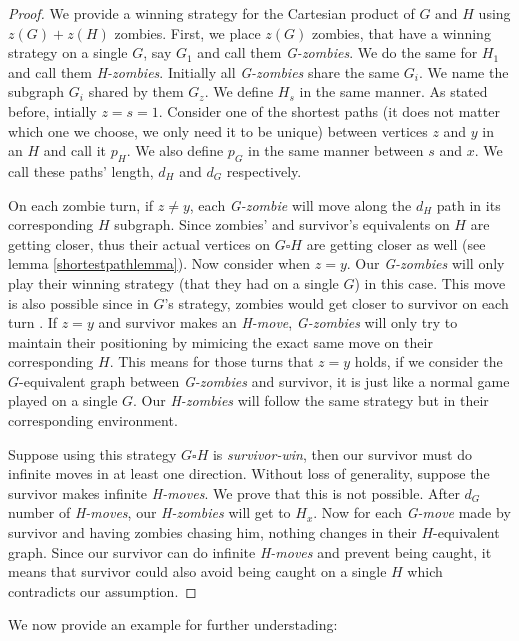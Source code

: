 \documentclass[1p]{elsarticle}
\begin{document}
\begin{proof}
	We provide a winning strategy for the Cartesian product of $G$ and $H$ using $z(G)+z(H)$ zombies. First, we place
	$z(G)$ zombies, that have a winning strategy on a single $G$, say $G_{1}$ and call them {\it G-zombies}. We do the
	same for $H_{1}$ and call them {\it H-zombies}. Initially all {\it G-zombies} share the same $G_{i}$. We name the
	subgraph $G_{i}$ shared by them $G_{z}$. We define $H_{s}$ in the same manner. As stated before, intially $z=s=1$.
	Consider one of the shortest paths (it does not matter which one we choose, we only need it to be unique) between
	vertices $z$ and $y$ in an $H$ and call it $p_H$. We also define $p_G$  in the same manner between $s$ and $x$. We
	call these paths' length, $d_H$ and $d_G$ respectively. 


	On each zombie turn, if $z \neq y$, each {\it G-zombie} will move along the $d_H$ path in its corresponding $H$
	subgraph. Since zombies' and survivor's equivalents on $H$ are getting closer, thus their actual vertices on $G
	\square H$ are getting closer as well (see lemma \ref{shortestpathlemma}).  Now consider when $z = y$. Our {\it
	G-zombies} will only play their winning strategy (that they had on a single $G$) in this case. This move is also
	possible since in $G$'s strategy, zombies would get closer to survivor on each turn . If $z = y$ and survivor makes
	an {\it H-move}, {\it G-zombies} will only try to maintain their positioning by mimicing the exact same move on
	their corresponding $H$. This means for those turns that $z=y$ holds, if we consider the $G$-equivalent graph
	between {\it G-zombies} and survivor, it is just like a normal game played on a single $G$. Our {\it H-zombies} will
	follow the same strategy but in their corresponding environment.
	
	
	Suppose using this strategy $G \square H$ is {\it survivor-win}, then our survivor must do infinite moves in at
	least one direction. Without loss of generality, suppose the survivor makes infinite {\it H-moves}. We prove that
	this is not possible. After $d_G$ number of {\it H-moves}, our {\it H-zombies} will get to $H_x$. Now for each {\it
	G-move} made by survivor and having zombies chasing him, nothing changes in their $H$-equivalent graph. Since our
	survivor can do infinite {\it H-moves} and prevent being caught, it means that survivor could also avoid being
	caught on a single $H$ which contradicts our assumption.
	
\end{proof}
We now provide an example for further understading:
\end{document}
